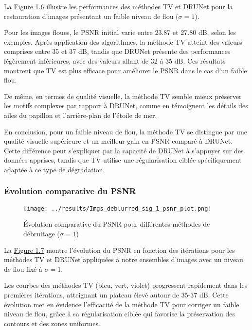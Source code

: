 \documentclass[a4paper, 12pt]{report} %
\begin{document}
La \hyperref[fig:6]{Figure 1.6} illustre les performances des méthodes TV et DRUNet pour la restauration d’images présentant un faible niveau de flou (\(\sigma = 1\)). 

Pour les images floues, le PSNR initial varie entre 23.87 et 27.80 dB, selon les exemples. Après application des algorithmes, la méthode TV atteint des valeurs comprises entre 35 et 37 dB, tandis que DRUNet présente des performances légèrement inférieures, avec des valeurs allant de 32 à 35 dB. Ces résultats montrent que TV est plus efficace pour améliorer le PSNR dans le cas d’un faible flou.

De même, en termes de qualité visuelle, la méthode TV semble mieux préserver les motifs complexes par rapport à DRUNet, comme en témoignent les détails des ailes du papillon et l’arrière-plan de l’étoile de mer.

En conclusion, pour un faible niveau de flou, la méthode TV se distingue par une qualité visuelle supérieure et un meilleur gain en PSNR comparé à DRUNet. Cette différence peut s'expliquer par la capacité de DRUNet à s’appuyer sur des données apprises, tandis que TV utilise une régularisation ciblée spécifiquement adaptée à ce type de dégradation.


\subsubsection{Évolution comparative du PSNR}

\begin{figure}[H]
\centering
\begin{adjustbox}{width=0.985\linewidth, totalheight=0.47 \textheight, angle=0, scale= 0.9, minipage= 4.2\linewidth, margin= 0}
    \texttt{[image: ../results/Imgs\_deblurred\_sig\_1\_psnr\_plot.png]}
\end{adjustbox}
    \caption{Évolution comparative du PSNR pour différentes méthodes de débruitage (\(\sigma = 1\))}
    \label{fig:7}
\end{figure} 

La \hyperref[fig:7]{Figure 1.7} montre l’évolution du PSNR en fonction des itérations pour les méthodes TV et DRUNet appliquées à notre ensembles d’images avec un niveau de flou fixé à \(\sigma = 1\).

Les courbes des méthodes TV (bleu, vert, violet) progressent rapidement dans les premières itérations, atteignant un plateau élevé autour de 35-37 dB. Cette évolution met en évidence l’efficacité de la méthode TV pour corriger un faible niveau de flou, grâce à sa régularisation ciblée qui favorise la préservation des contours et des zones uniformes.
\end{document}
